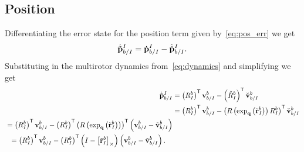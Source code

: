 \subsection{Position}

Differentiating the error state for the position term given
by~\eqref{eq:pos_err} we get
\begin{equation}
  \dot{\tilde{\boldsymbol{\mathrm{p}}}}_{b/I}^{I} = \dot{\boldsymbol{\mathrm{p}}}_{b/I}^{I} -
    \dot{\check{\boldsymbol{\mathrm{p}}}}_{b/I}^{I}.
\end{equation}
Substituting in the multirotor dynamics from~\eqref{eq:dynamics} and simplifying
we get
\begin{align}
  \dot{\tilde{\boldsymbol{\mathrm{p}}}}_{b/I}^{I} &= \left(R_{I}^{b}\right)^{\mathsf{T}}
  \boldsymbol{\mathrm{v}}_{b/I}^{b} - \left(\check{R}_{I}^{b}\right)^{\mathsf{T}}
  \check{\boldsymbol{\mathrm{v}}}_{b/I}^{b} \\ 
  &= \left(R_{I}^{b}\right)^{\mathsf{T}}
  \boldsymbol{\mathrm{v}}_{b/I}^{b} -
  \left(R\left(\exp_{\boldsymbol{\mathrm{q}}}\left(\tilde{\boldsymbol{\mathrm{r}}}_{I}^{b}\right)\right) R_{I}^{b}\right)^{\mathsf{T}}
  \check{\boldsymbol{\mathrm{v}}}_{b/I}^{b} \\
  \begin{split}
  &= \left(R_{I}^{b}\right)^{\mathsf{T}}
  \boldsymbol{\mathrm{v}}_{b/I}^{b}
  - \left(R_{I}^{b}\right)^{\mathsf{T}}
  \left(R\left(\exp_{\boldsymbol{\mathrm{q}}}\left(\tilde{\boldsymbol{\mathrm{r}}}_{I}^{b}\right)\right) \right)^{\mathsf{T}}
  \left(\boldsymbol{\mathrm{v}}_{b/I}^{b} - \tilde{\boldsymbol{\mathrm{v}}}_{b/I}^b\right) \\
  \end{split} \\
  \begin{split}
  &= \left(R_{I}^{b}\right)^{\mathsf{T}}
  \boldsymbol{\mathrm{v}}_{b/I}^{b}
  - \left(R_{I}^{b}\right)^{\mathsf{T}}
  \left( I - \left[ \tilde{\boldsymbol{\mathrm{r}}}_I^b \right]_{\times}\right)
  \left(\boldsymbol{\mathrm{v}}_{b/I}^{b} - \tilde{\boldsymbol{\mathrm{v}}}_{b/I}^{b}\right).
  \end{split}
\end{align}
